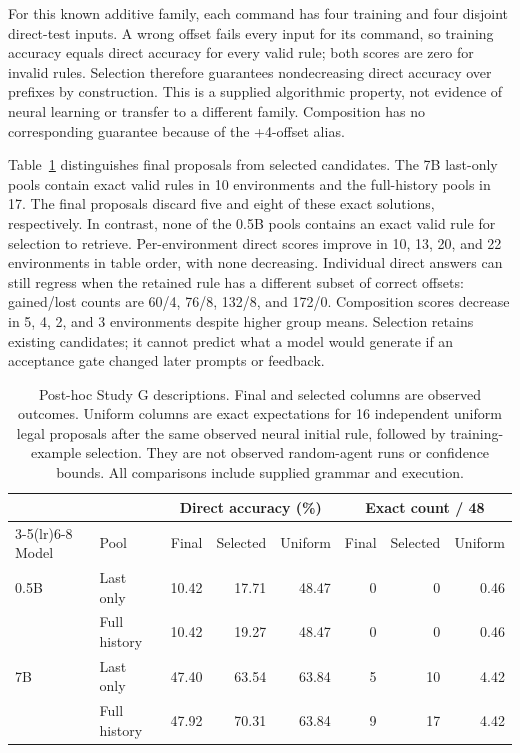 \documentclass[11pt]{article}
\begin{document}
For this known additive family, each command has four training and four
disjoint direct-test inputs. A wrong offset fails every input for its command,
so training accuracy equals direct accuracy for every valid rule; both scores
are zero for invalid rules. Selection therefore guarantees nondecreasing
direct accuracy over prefixes by construction. This is a supplied algorithmic
property, not evidence of neural learning or transfer to a different family.
Composition has no corresponding guarantee because of the +4-offset alias.

Table~\ref{tab:selection} distinguishes final proposals from selected
candidates. The 7B last-only pools contain exact valid rules in 10 environments
and the full-history pools in 17. The final proposals discard five and eight
of these exact solutions, respectively. In contrast, none of the 0.5B pools
contains an exact valid rule for selection to retrieve. Per-environment direct
scores improve in 10, 13, 20, and 22 environments in table order, with none
decreasing. Individual direct answers can still regress when the retained
rule has a different subset of correct offsets: gained/lost counts are 60/4,
76/8, 132/8, and 172/0. Composition scores decrease in 5, 4, 2, and 3
environments despite higher group means. Selection retains existing candidates;
it cannot predict what a model would generate if an acceptance gate changed
later prompts or feedback.

\begin{table}[htbp]
\centering\small
\begin{tabular}{llrrrrrr}
\toprule
& & \multicolumn{3}{c}{Direct accuracy (\%)} & \multicolumn{3}{c}{Exact count / 48} \\
\cmidrule(lr){3-5}\cmidrule(lr){6-8}
Model & Pool & Final & Selected & Uniform & Final & Selected & Uniform \\
\midrule
0.5B & Last only & 10.42 & 17.71 & 48.47 & 0 & 0 & 0.46 \\
& Full history & 10.42 & 19.27 & 48.47 & 0 & 0 & 0.46 \\
7B & Last only & 47.40 & 63.54 & 63.84 & 5 & 10 & 4.42 \\
& Full history & 47.92 & 70.31 & 63.84 & 9 & 17 & 4.42 \\
\bottomrule
\end{tabular}
\caption{Post-hoc Study G descriptions. Final and selected columns are
observed outcomes. Uniform columns are exact expectations for 16 independent
uniform legal proposals after the same observed neural initial rule, followed
by training-example selection. They are not observed random-agent runs or
confidence bounds. All comparisons include supplied grammar and execution.}
\label{tab:selection}
\end{table}
\end{document}
